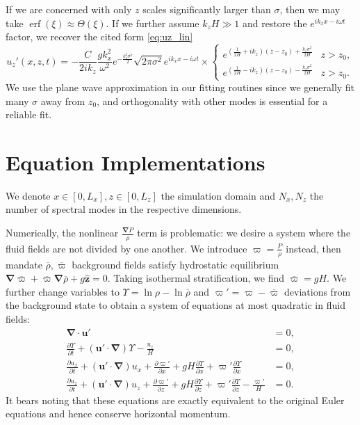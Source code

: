 \documentclass[
        fleqn,
        usenatbib,
    ]{mnras}
\newcommand*{\pd}[2]{\frac{\partial#1}{\partial#2}}
\newcommand*{\p}[1]{\left(#1\right)}
\newcommand*{\bm}[1]{\boldsymbol{\mathbf{#1}}}
\newcommand*{\uv}[1]{\hat{\boldsymbol{\mathbf{#1}}}}
\DeclareMathOperator*{\erf}{erf}
\begin{document}
If we are concerned with only $z$ scales significantly larger than $\sigma$,
then we may take $\erf(\xi) \approx \Theta(\xi)$. If we further assume $k_zH \gg
1$ and restore the $e^{ik_xx - i\omega t}$ factor, we recover the cited form
\autoref{eq:uz_lin}
\begin{equation}
    u_{z}'(x, z, t) = -\frac{C}{2ik_z}\frac{gk_x^2}{\omega^2}
        e^{-\frac{k_z^2\sigma^2}{2}}
        \sqrt{2\pi \sigma^2} e^{ik_xx - i\omega t} \times
    \begin{cases}
        e^{\p{\frac{1}{2H} + ik_z}\p{z - z_0} + \frac{k_z\sigma^2}{2H}}
            & z > z_0,\\
        e^{\p{\frac{1}{2H} - ik_z}\p{z - z_0} - \frac{k_z\sigma^2}{2H}}
            & z > z_0.
    \end{cases}
\end{equation}
We use the plane wave approximation in our fitting routines since we generally
fit many $\sigma$ away from $z_0$, and orthogonality with other modes is
essential for a reliable fit.

\section{Equation Implementations}\label{se:strat_impl}

We denote $x \in [0, L_x], z \in [0, L_z]$ the simulation domain and $N_x, N_z$
the number of spectral modes in the respective dimensions.

Numerically, the nonlinear $\frac{\bm{\nabla}P}{\rho}$ term is problematic: we
desire a system where the fluid fields are not divided by one another. We
introduce $\varpi = \frac{P}{\rho}$ instead, then mandate $\overline{\rho},
\overline{\varpi}$ background fields satisfy hydrostatic equilibrium
$\bm{\nabla}\overline{\varpi} + \overline{\varpi} \bm{\nabla}\overline{\rho} +
g\uv{z} = 0$. Taking isothermal stratification, we find $\overline{\varpi} = gH$. We
further change variables to $\Upsilon = \ln \rho - \ln \overline{\rho}$ and
$\varpi' = \varpi - \overline{\varpi}$ deviations from the background state to obtain a
system of equations at most quadratic in fluid fields:
\begin{subequations}\label{se:nl_var}
    \begin{align}
        \bm{\nabla} \cdot \bm{u}' &= 0,\\
        \pd{\Upsilon}{t} + \p{\bm{u}' \cdot \bm{\nabla}} \Upsilon
            - \frac{u_z}{H} &= 0,\\
        \pd{u_{x}}{t} + \p{\bm{u}' \cdot \bm{\nabla}}u_{x}
            + \pd{\varpi'}{x} + gH\pd{\Upsilon}{x}
            + \varpi' \pd{\Upsilon}{x} &= 0,\\
        \pd{u_z}{t} + \p{\bm{u}' \cdot \bm{\nabla}}u_z
            + \pd{\varpi'}{z} + gH\pd{\Upsilon}{z}
            + \varpi' \pd{\Upsilon}{z} - \frac{\varpi'}{H} &= 0.
    \end{align}
\end{subequations}
It bears noting that these equations are exactly equivalent to the original
Euler equations and hence conserve horizontal momentum.
\end{document}
